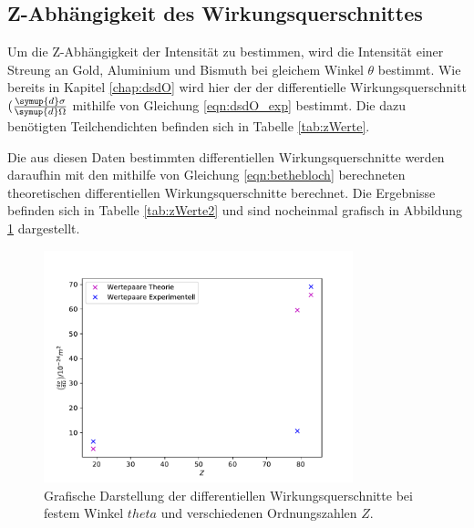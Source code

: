 \subsection{Z-Abhängigkeit des Wirkungsquerschnittes}
Um die Z-Abhängigkeit der Intensität zu bestimmen, wird die Intensität einer Streung an Gold, Aluminium und Bismuth bei gleichem Winkel $\theta$ bestimmt. Wie bereits in Kapitel \ref{chap:dsdO} wird hier der der differentielle Wirkungsquerschnitt $(\frac{\symup{d}\sigma}{\symup{d}\Omega}$ mithilfe von Gleichung \ref{eqn:dsdO_exp} bestimmt. 
Die dazu benötigten Teilchendichten befinden sich in Tabelle \ref{tab:zWerte}.

Die aus diesen Daten bestimmten differentiellen Wirkungsquerschnitte werden daraufhin mit den mithilfe von Gleichung \eqref{eqn:bethebloch} berechneten theoretischen differentiellen Wirkungsquerschnitte berechnet.
Die Ergebnisse befinden sich in Tabelle \ref{tab:zWerte2} und sind nocheinmal grafisch in Abbildung \ref{fig:zWerte2} dargestellt.  

\begin{figure}
    \centering
    \includegraphics[width = 0.8\textwidth]{data/plots/atomic_number.pdf}
    \caption{Grafische Darstellung der differentiellen Wirkungsquerschnitte bei festem Winkel $theta$ und verschiedenen Ordnungszahlen $Z$.}
    \label{fig:zWerte2}
\end{figure}